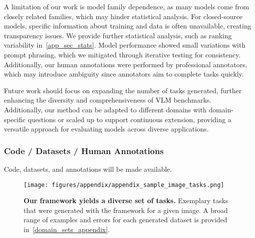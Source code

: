 A limitation of our work is model family dependence, as many models come from closely related families, which may hinder statistical analysis. For closed-source models, specific information about training and data is often unavailable, creating transparency issues. We provide further statistical analysis, such as ranking variability in~\cref{app_sec_stats}. Model performance showed small variations with prompt phrasing, which we mitigated through iterative testing for consistency.  Additionally, our human annotations were performed by professional annotators, which may introduce ambiguity since annotators aim to complete tasks quickly.

Future work should focus on expanding the number of tasks generated, further enhancing the diversity and comprehensiveness of VLM benchmarks. Additionally, our method can be adapted to different domains with domain-specific questions or scaled up to support continuous extension, providing a versatile approach for evaluating models across diverse applications.



\subsubsection*{Code / Datasets / Human Annotations}
Code, datasets, and annotations will be made available.



\begin{figure}
  \centering
  \texttt{[image: figures/appendix/appendix\_sample\_image\_tasks.png]}
   \caption{\textbf{Our framework yields a diverse set of tasks.} Exemplary tasks that were generated with the framework for a given image. A broad range of examples and errors for each generated dataset is provided in~\cref{domain_sets_appendix}.}
   \label{fig:example_cow}
\end{figure}
